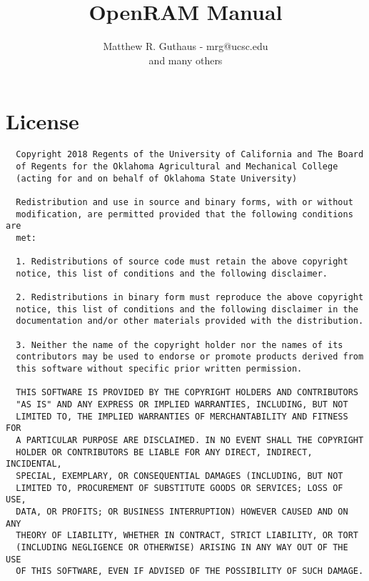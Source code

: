 \documentclass[11pt]{article}
\begin{document}
\title{OpenRAM Manual}
\author{Matthew R. Guthaus - mrg@ucsc.edu\\
  and many others
}
\maketitle
\newpage
\section{License}

\begin{verbatim}
  Copyright 2018 Regents of the University of California and The Board
  of Regents for the Oklahoma Agricultural and Mechanical College
  (acting for and on behalf of Oklahoma State University)
  
  Redistribution and use in source and binary forms, with or without
  modification, are permitted provided that the following conditions are
  met:
  
  1. Redistributions of source code must retain the above copyright
  notice, this list of conditions and the following disclaimer.
  
  2. Redistributions in binary form must reproduce the above copyright
  notice, this list of conditions and the following disclaimer in the
  documentation and/or other materials provided with the distribution.
  
  3. Neither the name of the copyright holder nor the names of its
  contributors may be used to endorse or promote products derived from
  this software without specific prior written permission.
  
  THIS SOFTWARE IS PROVIDED BY THE COPYRIGHT HOLDERS AND CONTRIBUTORS
  "AS IS" AND ANY EXPRESS OR IMPLIED WARRANTIES, INCLUDING, BUT NOT
  LIMITED TO, THE IMPLIED WARRANTIES OF MERCHANTABILITY AND FITNESS FOR
  A PARTICULAR PURPOSE ARE DISCLAIMED. IN NO EVENT SHALL THE COPYRIGHT
  HOLDER OR CONTRIBUTORS BE LIABLE FOR ANY DIRECT, INDIRECT, INCIDENTAL,
  SPECIAL, EXEMPLARY, OR CONSEQUENTIAL DAMAGES (INCLUDING, BUT NOT
  LIMITED TO, PROCUREMENT OF SUBSTITUTE GOODS OR SERVICES; LOSS OF USE,
  DATA, OR PROFITS; OR BUSINESS INTERRUPTION) HOWEVER CAUSED AND ON ANY
  THEORY OF LIABILITY, WHETHER IN CONTRACT, STRICT LIABILITY, OR TORT
  (INCLUDING NEGLIGENCE OR OTHERWISE) ARISING IN ANY WAY OUT OF THE USE
  OF THIS SOFTWARE, EVEN IF ADVISED OF THE POSSIBILITY OF SUCH DAMAGE.
\end{verbatim}


\newpage
\setcounter{tocdepth}{2}
\tableofcontents
\end{document}
